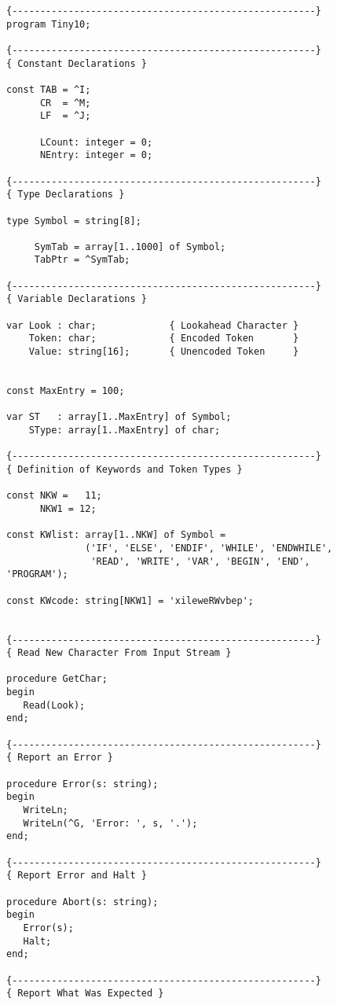 \begin{verbatim}
{------------------------------------------------------}
program Tiny10;

{------------------------------------------------------}
{ Constant Declarations }

const TAB = ^I;
      CR  = ^M;
      LF  = ^J;

      LCount: integer = 0;
      NEntry: integer = 0;

{------------------------------------------------------}
{ Type Declarations }

type Symbol = string[8];

     SymTab = array[1..1000] of Symbol;
     TabPtr = ^SymTab;

{------------------------------------------------------}
{ Variable Declarations }

var Look : char;             { Lookahead Character }
    Token: char;             { Encoded Token       }
    Value: string[16];       { Unencoded Token     }


const MaxEntry = 100;

var ST   : array[1..MaxEntry] of Symbol;
    SType: array[1..MaxEntry] of char;

{------------------------------------------------------}
{ Definition of Keywords and Token Types }

const NKW =   11;
      NKW1 = 12;

const KWlist: array[1..NKW] of Symbol =
              ('IF', 'ELSE', 'ENDIF', 'WHILE', 'ENDWHILE',
               'READ', 'WRITE', 'VAR', 'BEGIN', 'END',
'PROGRAM');

const KWcode: string[NKW1] = 'xileweRWvbep';


{------------------------------------------------------}
{ Read New Character From Input Stream }

procedure GetChar;
begin
   Read(Look);
end;

{------------------------------------------------------}
{ Report an Error }

procedure Error(s: string);
begin
   WriteLn;
   WriteLn(^G, 'Error: ', s, '.');
end;

{------------------------------------------------------}
{ Report Error and Halt }

procedure Abort(s: string);
begin
   Error(s);
   Halt;
end;

{------------------------------------------------------}
{ Report What Was Expected }


\end{verbatim}
